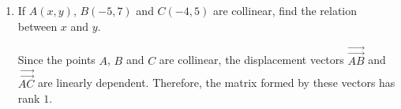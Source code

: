 \begin{enumerate}[label=\thesubsection.\arabic*, ref=\thesubsection.\theenumi]
	      Substituting $d=5$ into the first equation,
	      \begin{align*}
		      12a+31(5) &=167,\\
		      12a &=12,\\
		      a &=1.
	      \end{align*}

	      Therefore, the first term is $1$ and the common difference is $5$.
	      The required AP is
	      \begin{align*}
		      1,6,11,16,21,26,31,\ldots
	      \end{align*}

	      The general term is
	\begin{align*}
    x(n) &= (a+(n-1)d)u(n-1)
    \tag*{\eqref{formula:C10-Q08-F03}}\\
         &= (1+5(n-1))u(n-1)\\
         &= (5n-4)u(n-1).
\end{align*}	
		\[
u(n-1) =
\begin{cases}
1, & n \geq 1,\\
0, & \text{otherwise}.
\end{cases}
\]

	      Verifying the given conditions,
	      \begin{align*}
		      S_5 &=5(1)+10(5)=55,\\
		      S_7 &=7(1)+21(5)=112,\\
		      S_5+S_7 &=55+112=167,\\
		      S_{10} &=10(1)+45(5)=235.
	      \end{align*}

	      Both conditions are satisfied. The following code verifies the solution.
	      \begin{lstlisting}[frame=single, basicstyle=\rmfamily, escapeinside={(*@}{@*)}]
(*@\makebox[\dimexpr\linewidth-2\fboxsep-2\fboxrule\relax][c]{10/codes/Q08.py}@*)
\end{lstlisting}

    \item
    \label{question:C10-Q10}
    \label{question-short:C10-Q10} If $A(x,y)$, $B(-5,7)$ and $C(-4,5)$ are collinear, find the relation between $x$ and $y$.

    \par
    \smallskip
    \solution

     Since the points $A$, $B$ and $C$ are collinear, the displacement vectors
	      $\overrightarrow{\vec{AB}}$ and $\overrightarrow{\vec{AC}}$ are linearly dependent.
	      Therefore, the matrix formed by these vectors has rank $1$.


\end{enumerate}
